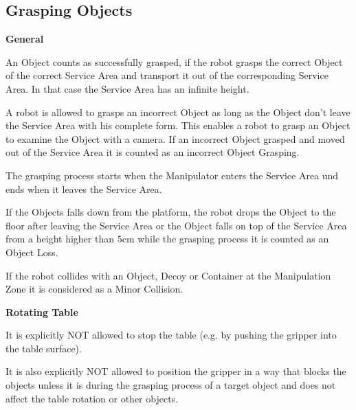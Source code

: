 




\subsection{Grasping Objects} \label{ssec:GraspingObjects}

\textbf{General}

An Object counts as successfully grasped, if the robot grasps the correct Object of the correct Service Area and transport it out of the corresponding Service Area. In that case the Service Area has an infinite height.

A robot is allowed to grasps an incorrect Object as long as the Object don't leave the Service Area with his complete form. This enables a robot to grasp an Object to examine the Object with a camera. If an incorrect Object grasped and moved out of the Service Area it is counted as an incorrect Object Grasping.

The grasping process starts when the Manipulator enters the Service Area und ends when it leaves the Service Area.

If the Objects falls down from the platform, the robot drops the Object to the floor after leaving the Service Area or the Object falls on top of the Service Area from a height higher than $5\si{\centi\meter}$ while the grasping process it is counted as an Object Loss.

If the robot collides with an Object, Decoy or Container at the Manipulation Zone it is considered as a Minor Collision.

\textbf{Rotating Table}

It is explicitly NOT allowed to stop the table (e.g. by pushing the gripper into the table surface).

It is also explicitly NOT allowed to position the gripper in a way that blocks the objects 
unless it is during the grasping process of a target object and does not affect the table rotation or other objects.

